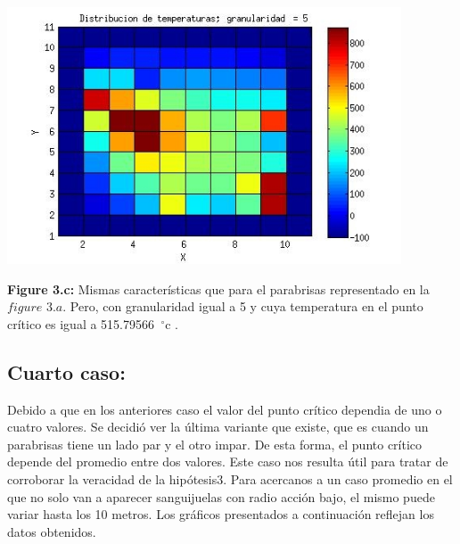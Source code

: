 \documentclass[a4paper]{article}
\begin{document}
\includegraphics[width=\textwidth,height=3.0in,keepaspectratio
]{r7h5.jpg} \newline
\begin {flushleft}
\textbf{Figure 3.c:} Mismas características que para el parabrisas representado en la $figure$ $3.a$. Pero, con granularidad igual a 5 y cuya temperatura en el punto crítico es igual a 515.79566\hspace{-1.5mm}$\phantom{a}^{\circ}$c .
\end{flushleft}


\subsection{Cuarto caso:}


Debido a que en los anteriores caso el valor del punto crítico dependia de uno o cuatro valores. Se decidió ver la última variante que existe, que es cuando un parabrisas tiene un lado par y el otro impar. De esta forma, el punto crítico depende del promedio entre dos valores. \newline
Este caso nos resulta útil para tratar de corroborar la veracidad de la hipótesis3. Para acercanos a un caso promedio en el que no solo van a aparecer sanguijuelas con radio acción bajo, el mismo puede variar hasta los 10 metros. Los gráficos presentados a continuación reflejan los datos obtenidos.    
\end{document}
